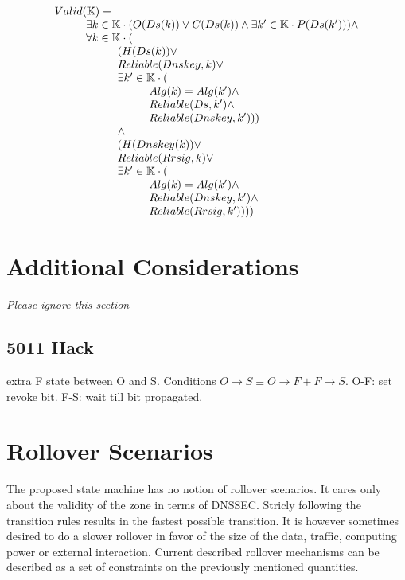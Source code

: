 \documentclass[twoside,english, a4paper]{article}
\begin{document}
\begin{equation}
\begin{array}{l}
Valid(\mathbb{K}) \equiv \\
\hskip 1cm		\exists k \in \mathbb{K} \cdot ( O(Ds(k)) \vee C(Ds(k)) \wedge \exists k' \in \mathbb{K} \cdot P(Ds(k')))
\hskip 0cm		\wedge \\
\hskip 1cm		\forall k \in \mathbb{K} \cdot (\\
\hskip 2cm			(H(Ds(k)) \vee \\
\hskip 2cm			Reliable(Dnskey, k) \vee \\
\hskip 2cm				\exists k' \in \mathbb{K} \cdot (\\
\hskip 3cm				Alg(k) = Alg(k') \wedge \\
\hskip 3cm				Reliable(Ds, k') \wedge \\
\hskip 3cm				Reliable(Dnskey, k') )) \\
\hskip 2cm			\wedge\\
\hskip 2cm			(H(Dnskey(k)) \vee \\
\hskip 2cm			Reliable(Rrsig, k) \vee \\
\hskip 2cm			\exists k' \in \mathbb{K} \cdot (\\
\hskip 3cm				Alg(k) = Alg(k') \wedge \\
\hskip 3cm				Reliable(Dnskey, k') \wedge \\
\hskip 3cm				Reliable(Rrsig, k') )))
\end{array}
\end{equation}

\section{Additional Considerations}

\emph{Please ignore this section}
\subsection{5011 Hack}

extra F state between O and S. Conditions $O\rightarrow S \equiv O\rightarrow F + F\rightarrow S$.
O-F: set revoke bit. F-S: wait till bit propagated. 

\section{Rollover Scenarios}

The proposed state machine has no notion of rollover scenarios. It cares
only about the validity of the zone in terms of DNSSEC. Stricly following
the transition rules results in the fastest possible transition. It is
however sometimes desired to do a slower rollover in favor of the size 
of the data, traffic, computing power or external interaction. Current
described rollover mechanisms can be described as a set of constraints
on the previously mentioned quantities.
\end{document}
